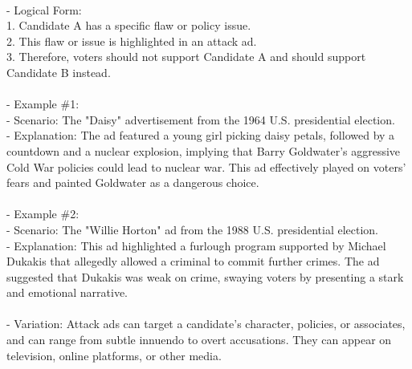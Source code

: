 \documentclass[a4paper,12pt,single,pdftex]{scrartcl}
\begin{document}
    
      
    \\

    
      - Logical Form:
    \\

    
        1. Candidate A has a specific flaw or policy issue.
    \\

    
        2. This flaw or issue is highlighted in an attack ad.
    \\

    
        3. Therefore, voters should not support Candidate A and should support Candidate B instead.
    \\

    
      
    \\

    
      - Example \#1:
    \\

    
        - Scenario: The "Daisy" advertisement from the 1964 U.S. presidential election.
    \\

    
        - Explanation: The ad featured a young girl picking daisy petals, followed by a countdown and a nuclear explosion, implying that Barry Goldwater's aggressive Cold War policies could lead to nuclear war. This ad effectively played on voters' fears and painted Goldwater as a dangerous choice.
    \\

    
      
    \\

    
      - Example \#2:
    \\

    
        - Scenario: The "Willie Horton" ad from the 1988 U.S. presidential election.
    \\

    
        - Explanation: This ad highlighted a furlough program supported by Michael Dukakis that allegedly allowed a criminal to commit further crimes. The ad suggested that Dukakis was weak on crime, swaying voters by presenting a stark and emotional narrative.
    \\

    
      
    \\

    
      - Variation: Attack ads can target a candidate's character, policies, or associates, and can range from subtle innuendo to overt accusations. They can appear on television, online platforms, or other media.
    \\
\end{document}
